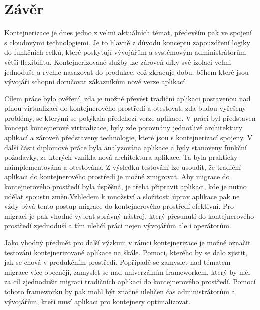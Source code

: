 \chapter{Závěr}
Kontejnerizace je dnes jedno z velmi aktuálních témat, především pak ve spojení s cloudovými technologiemi. Je to hlavně z důvodu konceptu zapouzdření logiky do funkčních celků, které poskytují vývojářům a systémovým administrátorům větší flexibilitu. Kontejnerizované služby lze zároveň díky své izolaci velmi jednoduše a rychle nasazovat do produkce, což zkracuje dobu, během které jsou vývojáři schopni doručovat zákazníkům nové verze aplikací.

 Cílem práce  bylo ověření, zda je možné převést tradiční aplikaci postavenou nad plnou virtualizací do kontejnerového prostředí a otestovat, zda budou vyřešeny problémy, se kterými se potýkala předchozí verze aplikace. V práci byl představen koncept kontejnerové virtualizace, byly zde porovnány jednotlivé architektury aplikací a zároveň představeny technologie, které jsou s kontejnerizací spojeny. V další části diplomové práce byla analyzována aplikace a byly stanoveny funkční požadavky, ze kterých vznikla nová architektura aplikace. Ta byla prakticky naimplementována a otestována. Z výsledku testování lze usoudit, že tradiční aplikaci do kontejnerového prostředí je možné zmigrovat. Aby migrace do kontejnerového prostředí byla úspěšná, je třeba připravit aplikaci, kde je nutno udělat spoustu změn.Vzhledem k množství a složitosti úprav aplikace pak ne vždy bývá tento postup migrace do kontejnerového prostředí efektivní. Pro migraci je pak vhodné vybrat správný nástroj, který přesunutí do kontejnerového prostředí zjednoduší a tím ulehčí práci nejen vývojářům ale i operátorům. 
 
Jako vhodný předmět pro další výzkum v rámci kontejnerizace je možné označit testování kontejnerizované aplikace na škále. Pomocí, kterého by se dalo zjistit, jak se chová v produkčním prostředí. Popřípadě se zamyslet nad tématem migrace více obecněji, zamyslet se nad univerzálním frameworkem, který by měl za cíl zjednodušit migraci tradičních aplikací do kontejnerového prostředí. Pomocí tohoto frameworku by pak mohl být značně ulehčen čas administrátorům a vývojářům, kteří musí aplikaci pro kontejnery optimalizovat.  
